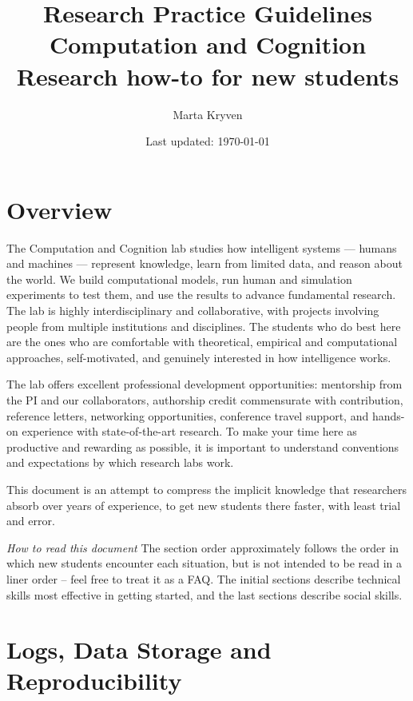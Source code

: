 \documentclass[11pt, letterpaper]{article}
\title{\textbf{Research Practice Guidelines}\\
\large Computation and Cognition Research how-to for new students }
\author{Marta Kryven}
\date{\small Last updated: \today}
\begin{document}
\maketitle
\tableofcontents
\newpage

\section{Overview}

The Computation and Cognition lab studies how intelligent systems — humans and machines — represent knowledge, learn from limited data, and reason about the world. We build computational models, run human and simulation experiments to test them, and use the results to advance fundamental research. The lab is highly interdisciplinary and collaborative, with projects involving people from multiple institutions and disciplines. The students who do best here are the ones who are comfortable with theoretical, empirical and computational approaches, self-motivated, and genuinely interested in how intelligence works.

The lab offers excellent professional development opportunities: mentorship from the PI and our collaborators, authorship credit commensurate with contribution, reference letters, networking opportunities, conference travel support, and hands-on experience with state-of-the-art research. To make your time here as productive and rewarding as possible, it is important to understand conventions and expectations by which research labs work. 

\vspace{1cm}
\begin{mdframed}
 This document is an attempt to compress the implicit knowledge that researchers absorb over years of experience, to get new students there faster, with least trial and error.
\end{mdframed}

\vspace{1cm}

\textit{How to read this document}
The section order approximately follows the order in which new students encounter each situation, but is not intended to be read in a liner order -- feel free to treat it as a FAQ. The initial sections describe technical skills most effective in getting started, and the last sections describe social skills.


\section{Logs, Data Storage and Reproducibility}\label{sec:data}
\end{document}
